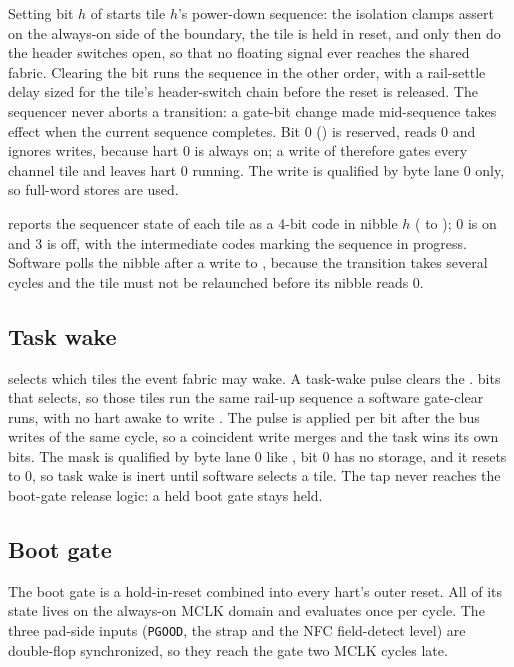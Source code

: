 Setting bit $h$ of  starts tile $h$'s power-down sequence: the isolation clamps assert on the always-on side of the boundary, the tile is held in reset, and only then do the header switches open, so that no floating signal ever reaches the shared fabric. Clearing the bit runs the sequence in the other order, with a rail-settle delay sized for the tile's header-switch chain before the reset is released. The sequencer never aborts a transition: a gate-bit change made mid-sequence takes effect when the current sequence completes. Bit 0 () is reserved, reads 0 and ignores writes, because hart 0 is always on; a write of \texttt{\PwrGateMask} therefore gates every channel tile and leaves hart 0 running. The write is qualified by byte lane 0 only, so full-word stores are used.

 reports the sequencer state of each tile as a 4-bit code in nibble $h$ ( to ); 0 is on and 3 is off, with the intermediate codes marking the sequence in progress. Software polls the nibble after a write to , because the transition takes several cycles and the tile must not be relaunched before its nibble reads 0.

\subsection{Task wake}

 selects which tiles the event fabric may wake. A  task-wake pulse clears the . bits that  selects, so those tiles run the same rail-up sequence a software gate-clear runs, with no hart awake to write . The pulse is applied per bit after the bus writes of the same cycle, so a coincident  write merges and the task wins its own bits. The mask is qualified by byte lane 0 like , bit 0 has no storage, and it resets to 0, so task wake is inert until software selects a tile. The tap never reaches the boot-gate release logic: a held boot gate stays held.

\subsection{Boot gate}

The boot gate is a hold-in-reset combined into every hart's outer reset. All of its state lives on the always-on MCLK domain and evaluates once per cycle. The three pad-side inputs (\texttt{PGOOD}, the strap and the NFC field-detect level) are double-flop synchronized, so they reach the gate two MCLK cycles late.

